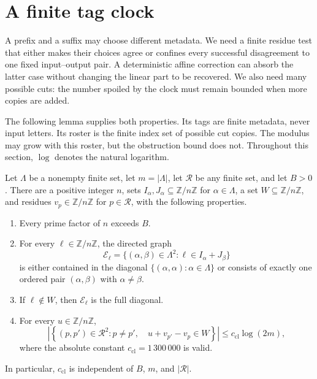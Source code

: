 \section{A finite tag clock}
\label{sec:clock}

A prefix and a suffix may choose different metadata. We need a finite
residue test that either makes their choices agree or confines every
successful disagreement to one fixed input--output pair. A deterministic
affine correction can absorb the latter case without changing the linear
part to be recovered. We also need many possible cuts: the number spoiled
by the clock must remain bounded when more copies are added.

The following lemma supplies both properties. Its tags are finite metadata,
never input letters. Its roster is the finite index set of possible cut
copies. The modulus may grow with this roster, but the obstruction bound
does not. Throughout this section, $\log$ denotes the natural logarithm.

\begin{lemma}
\label{lem:clock}
Let $\Lambda$ be a nonempty finite set, let $m=|\Lambda|$, let
$\mathcal R$ be any finite set, and let $B>0$.  There are a positive integer
$n$, sets $I_\alpha,J_\alpha\subseteq\mathbb Z/n\mathbb Z$ for
$\alpha\in\Lambda$, a set $W\subseteq\mathbb Z/n\mathbb Z$, and residues
$v_p\in\mathbb Z/n\mathbb Z$ for $p\in\mathcal R$, with the following
properties.
\begin{enumerate}[label=\textup{(\roman*)}]
\item Every prime factor of $n$ exceeds $B$.
\item For every $\ell\in\mathbb Z/n\mathbb Z$, the directed graph
\[
 \mathcal E_\ell
 =\{(\alpha,\beta)\in\Lambda^2:
                 \ell\in I_\alpha+J_\beta\}
\]
is either contained in the diagonal
$\{(\alpha,\alpha):\alpha\in\Lambda\}$ or consists of exactly one
ordered pair $(\alpha,\beta)$ with $\alpha\ne\beta$.
\item If $\ell\notin W$, then $\mathcal E_\ell$ is the full diagonal.
\item For every $u\in\mathbb Z/n\mathbb Z$,
\begin{equation}
 \left|\left\{(p,p')\in\mathcal R^2:
       p\ne p',\quad u+v_{p'}-v_p\in W\right\}\right|
 \le c_{\mathrm{cl}}\log(2m),
 \label{eq:clock-roster}
\end{equation}
where the absolute constant $c_{\mathrm{cl}}=1\,300\,000$ is valid.
\end{enumerate}
In particular, $c_{\mathrm{cl}}$ is independent of $B$, $m$, and
$|\mathcal R|$.
\end{lemma}

